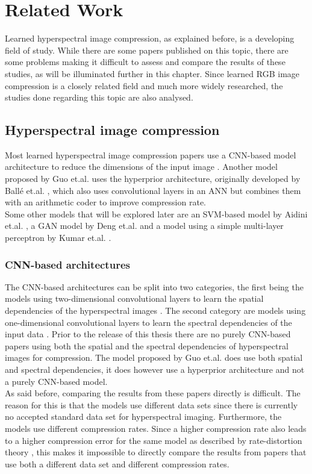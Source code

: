 \chapter{Related Work\label{cha:chapter2}}
Learned hyperspectral image compression, as explained before, is a developing field of study. While there are some papers published on this topic, there are some problems making it difficult to assess and compare the results of these studies, as will be illuminated further in this chapter. Since learned RGB image compression is a closely related field and much more widely researched, the studies done regarding this topic are also analysed.
\section{Hyperspectral image compression \label{sec:ch2hyperspectral}}
Most learned hyperspectral image compression papers use a CNN-based model architecture to reduce the dimensions of the input image \citep{kuester_1d-convolutional_2021}\citep{kuester_transferability_2022}\citep{la_grassa_hyperspectral_2022}. Another model proposed by Guo et.al. \citep{guo_learned_2021} uses the hyperprior architecture, originally developed by Ballé et.al. \citep{balle_end--end_2017}, which also uses convolutional layers in an ANN but combines them with an arithmetic coder to improve compression rate.\\
Some other models that will be explored later are an SVM-based model by Aidini et.al. \citep{aidini_hyperspectral_2019}, a GAN model by Deng et.al. \citep{deng_learning-based_2020} and a model using a simple multi-layer perceptron by Kumar et.al. \citep{leal-taixe_onboard_2019}.
\subsection{CNN-based architectures}
The CNN-based architectures can be split into two categories, the first being the models using two-dimensional convolutional layers to learn the spatial dependencies of the hyperspectral images \citep{la_grassa_hyperspectral_2022}. The second category are models using one-dimensional convolutional layers to learn the spectral dependencies of the input data \citep{kuester_1d-convolutional_2021}\citep{kuester_transferability_2022}. Prior to the release of this thesis there are no purely CNN-based papers using both the spatial and the spectral dependencies of hyperspectral images for compression. The model proposed by Guo et.al. \citep{guo_learned_2021} does use both spatial and spectral dependencies, it does however use a hyperprior architecture and not a purely CNN-based model.\\
As said before, comparing the results from these papers directly is difficult. The reason for this is that the models use different data sets since there is currently no accepted standard data set for hyperspectral imaging. Furthermore, the models use different compression rates. Since a higher compression rate also leads to a higher compression error for the same model as described by rate-distortion theory \citep{berger_rate-distortion_2003}, this makes it impossible to directly compare the results from papers that use both a different data set and different compression rates. 

